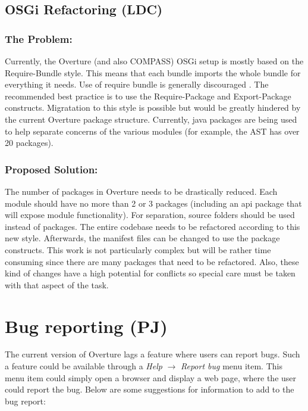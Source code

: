 \documentclass[11pt]{report}
\begin{document}
    


    \subsection*{OSGi Refactoring (LDC)}
    \label{ssec:osgi} 

    \subsubsection{The Problem:}
    Currently, the Overture (and also COMPASS) OSGi setup is mostly based on the 
    \textsf{Require-Bundle} style. This means that each bundle imports the whole 
    bundle for everything it needs. Use of require bundle is generally discouraged
    \cite{osgi2013}. The recommended best practice is to use the 
    \textsf{Require-Package} and \textsf{Export-Package} constructs. Migratation
    to this style is possible but would be greatly hindered by the current Overture
    package structure. Currently, java packages are being used to help separate
    concerns of the various modules (for example, the AST has over 20 packages).

    \subsubsection{Proposed Solution:}
    The number of packages in Overture needs to be drastically reduced. Each
    module should have no more than 2 or 3 packages (including an api package
    that will expose module functionality). For separation, source folders
    should be used instead of packages. The entire codebase needs to be
    refactored according to this new style. Afterwards, the manifest files can
    be changed to use the package constructs. This work is not particularly
    complex but will be rather time consuming since there are many packages
    that need to be refactored. Also, these kind of changes have a high
    potential for conflicts so special care must be taken with that aspect of
    the task.

\section*{Bug reporting (PJ)}

The current version of Overture lags a feature where users can report bugs. Such a feature could be available through a \emph{Help} $ \rightarrow$ \emph{Report bug} menu item. This menu item could simply open a browser and display a web page, where the user could report the bug. Below are some suggestions for information to add to the bug report:
\end{document}
